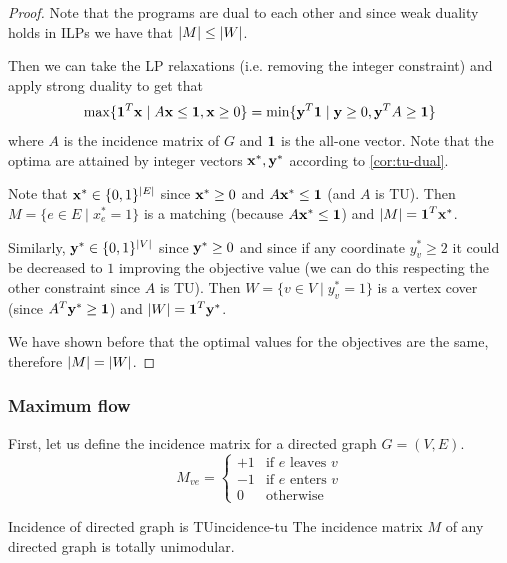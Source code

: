 \documentclass[12pt]{extarticle}
\renewcommand{\vec}[1]{\bvec{#1}}
\begin{document}
\begin{proof}
	Note that the programs are dual to each other and since weak duality holds in ILPs we have that
	$\abs{M} \leq \abs{W}$.

	Then we can take the LP relaxations (i.e. removing the integer constraint) and apply strong
	duality to get that
	\begin{equation}
		\max \{ \vec 1^T \vec x \mid A \vec x \leq \vec 1, \vec x \geq 0\} =
		\min \{ \vec y^T \vec 1 \mid \vec y \geq 0, \vec y^T A \geq \vec 1 \}
	\end{equation}
	where $A$ is the incidence matrix of $G$ and $\vec 1$ is the all-one vector.
	Note that the optima are attained by integer vectors $\vec x^*, \vec y^*$ according to
	\cref{cor:tu-dual}.

	Note that $\vec x^* \in \{0, 1\}^\abs{E}$ since $\vec x^* \geq 0$ and $A \vec x^* \leq \vec 1$
	(and $A$ is TU).
	Then $M = \{ e \in E \mid x^*_e = 1 \}$ is a matching (because $A \vec x^* \leq \vec 1$) and
	$\abs{M} = \vec 1^T \vec x^*$.

	Similarly, $\vec y^* \in \{0, 1\}^\abs{V}$ since $\vec y^* \geq 0$ and since if any coordinate
	$y^*_v \geq 2$ it could be decreased to $1$ improving the objective value (we can do this
	respecting the other constraint since $A$ is TU).
	Then $W = \{ v \in V \mid y^*_v = 1 \}$ is a vertex cover (since $A^T \vec y^* \geq \vec 1$) and
	$\abs{W} = \vec 1^T \vec y^*$.

	We have shown before that the optimal values for the objectives are the same, therefore
	$\abs{M}=\abs{W}$.
\end{proof}

\subsubsection{Maximum flow}

First, let us define the incidence matrix for a directed graph $G=(V, E)$.
\begin{equation}
	M_{ve} = \begin{cases}
		+1 & \text{if $e$ leaves $v$} \\
		-1 & \text{if $e$ enters $v$} \\
		0  & \text{otherwise}
	\end{cases}
\end{equation}

\begin{proposition}{Incidence of directed graph is TU}{incidence-tu}
	The incidence matrix $M$ of any directed graph is totally unimodular.
\end{proposition}
\end{document}
